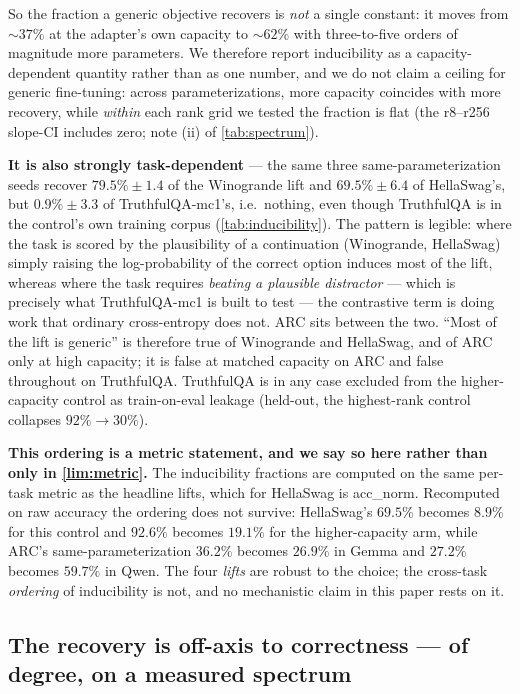 So the fraction a generic objective recovers is \emph{not} a single constant: it moves
from ${\sim}37\%$ at the adapter's own capacity to ${\sim}62\%$ with three-to-five
orders of magnitude more parameters. We therefore report inducibility as a
capacity-dependent quantity rather than as one number, and we do not claim a ceiling
for generic fine-tuning: across parameterizations, more capacity coincides with more
recovery, while \emph{within} each rank grid we tested the fraction is flat (the
r8--r256 slope-CI includes zero; note (ii) of \cref{tab:spectrum}).

\textbf{It is also strongly task-dependent} --- the same three same-parameterization
seeds recover $\mathbf{79.5\% \pm 1.4}$ of the Winogrande lift and
$\mathbf{69.5\% \pm 6.4}$ of HellaSwag's, but $\mathbf{0.9\% \pm 3.3}$ of
TruthfulQA-mc1's, i.e.\ nothing, even though TruthfulQA is in the control's own
training corpus (\cref{tab:inducibility}). The pattern is legible: where the task is
scored by the plausibility of a continuation (Winogrande, HellaSwag) simply raising
the log-probability of the correct option induces most of the lift, whereas where the
task requires \emph{beating a plausible distractor} --- which is precisely what
TruthfulQA-mc1 is built to test --- the contrastive term is doing work that ordinary
cross-entropy does not. ARC sits between the two. ``Most of the lift is generic'' is
therefore true of Winogrande and HellaSwag, and of ARC only at high capacity; it is
false at matched capacity on ARC and false throughout on TruthfulQA. TruthfulQA is
in any case excluded from the higher-capacity control as train-on-eval leakage
(held-out, the highest-rank control collapses $92\%{\rightarrow}30\%$).

\textbf{This ordering is a metric statement, and we say so here rather than only in
\cref{lim:metric}.} The inducibility fractions are computed on the same per-task
metric as the headline lifts, which for HellaSwag is acc\_norm. Recomputed on raw
accuracy the ordering does not survive: HellaSwag's $69.5\%$ becomes $8.9\%$ for this
control and $92.6\%$ becomes $19.1\%$ for the higher-capacity arm, while ARC's
same-parameterization $36.2\%$ becomes $26.9\%$ in Gemma and $27.2\%$ becomes
$59.7\%$ in Qwen. The four \emph{lifts} are robust to the choice; the cross-task
\emph{ordering} of inducibility is not, and no mechanistic claim in this paper rests
on it.

\subsection{The recovery is off-axis to correctness --- of degree, on a measured
spectrum}\label{disc:geometry}

